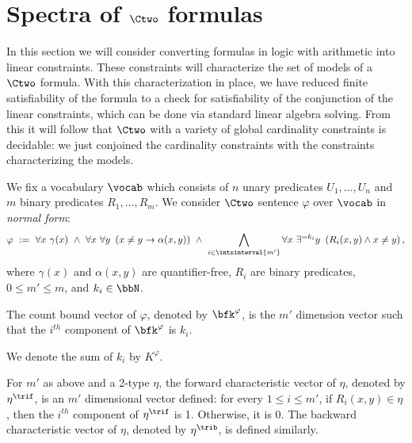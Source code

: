 \section{Spectra of $\Ctwo$ formulas} \label{sec:ctwo}



In this section we will consider converting formulas in logic with arithmetic into linear constraints. These constraints will characterize  the set of models of a $\Ctwo$ formula. With this characterization in place, we have reduced finite satisfiability of the formula to a check for satisfiability of the conjunction of the linear constraints, which can be done via standard linear algebra solving. From this it will follow that $\Ctwo$ with a variety of global cardinality constraints is decidable: we just conjoined the cardinality constraints with the constraints characterizing the models.

We fix a vocabulary $\vocab$ which consists of $n$ unary predicates $U_1, \ldots, U_n$ and $m$ binary predicates $R_1, \ldots, R_m$.
We consider $\Ctwo$ sentence $\varphi$ over $\vocab$ in \emph{normal form}:
\begin{equation*}
    \varphi\ :=\ 
    \forall x\ \gamma(x)\ \land\ 
    \forall x\ \forall y\ \left(x \neq y \to \alpha(x, y)\right)\ \land\ 
    \bigwedge_{i \in \intsinterval{m'}} \forall x\ \exists^{=k_i} y\ \left(R_i(x,y) \land x \neq y\right),
\end{equation*}
where $\gamma(x)$ and $\alpha(x, y)$ are quantifier-free,
$R_i$ are binary predicates,
$0 \le m' \le m$,
and $k_i \in \bbN$.

\begin{definition}
The count bound vector of $\varphi$, denoted by $\bfk^\varphi$, 
is the $m'$ dimension vector such that
the $i^{th}$ component of $\bfk^\varphi$ is $k_i$.
\end{definition}

We denote the sum of $k_i$ by $K^\varphi$.
\begin{definition}
    For $m'$ as above and a 2-type $\eta$, the forward characteristic vector of $\eta$,
    denoted by $\eta^\trif$, is an $m'$ dimensional vector defined:
    for every $1 \le i \le m'$, if $R_i(x, y) \in \eta$,
    then the $i^{th}$ component of $\eta^\trif$ is 1.
    Otherwise, it is $0$.
    The backward characteristic vector of $\eta$,
    denoted by $\eta^\trib$,
    is defined similarly.
\end{definition}

